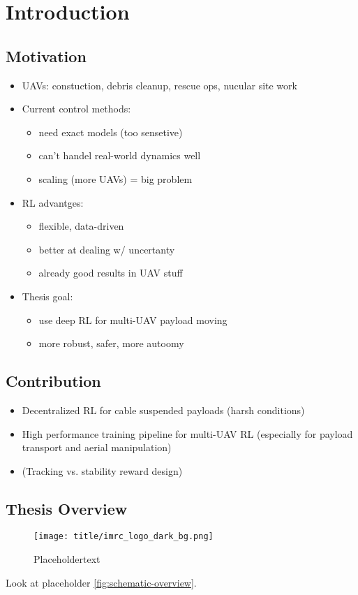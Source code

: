 \chapter{Introduction}

\section{Motivation}
\begin{itemize}
    \item UAVs: constuction, debris cleanup, rescue ops, nucular site work
    
    \item Current control methods:
    \begin{itemize}
        \item need exact models (too sensetive)
        \item can't handel real-world dynamics well
        \item scaling (more UAVs) = big problem
    \end{itemize}
    
    \item RL advantges:
    \begin{itemize}
        \item flexible, data-driven
        \item better at dealing w/ uncertanty
        \item already good results in UAV stuff
    \end{itemize}
    
    \item Thesis goal:
    \begin{itemize}
        \item use deep RL for multi-UAV payload moving
        \item more robust, safer, more autoomy
    \end{itemize}
\end{itemize}
\section{Contribution}
\begin{itemize}
    \item Decentralized RL for cable suspended payloads (harsh conditions)
    \item High performance training pipeline for multi-UAV RL (especially for payload transport and aerial manipulation)
    \item (Tracking vs. stability reward design)
\end{itemize}
\section{Thesis Overview}
\begin{figure}
    \centering
    \texttt{[image: title/imrc\_logo\_dark\_bg.png]}
    \caption{Placeholdertext}
    \label{fig:schematic-overview}
\end{figure}
Look at placeholder \autoref{fig:schematic-overview}.
